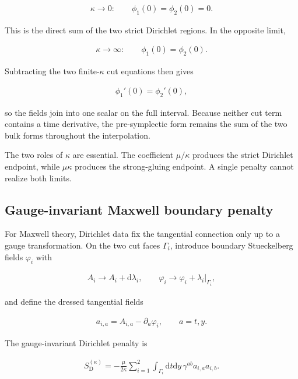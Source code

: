 \begin{align}
\kappa\to0:
\qquad
\phi_1(0)=\phi_2(0)=0.
\end{align}

This is the direct sum of the two strict Dirichlet regions. In the opposite limit,

\begin{align}
\kappa\to\infty:
\qquad
\phi_1(0)=\phi_2(0).
\end{align}

Subtracting the two finite-$\kappa$ cut equations then gives

\begin{align}
\phi_1'(0)=\phi_2'(0),
\end{align}

so the fields join into one scalar on the full interval. Because neither cut term contains a time derivative, the pre-symplectic form remains the sum of the two bulk forms throughout the interpolation.

The two roles of $\kappa$ are essential. The coefficient $\mu/\kappa$ produces the strict Dirichlet endpoint, while $\mu\kappa$ produces the strong-gluing endpoint. A single penalty cannot realize both limits.

\subsection{Gauge-invariant Maxwell boundary penalty}\label{subsec:dirichlet-maxwell}

For Maxwell theory, Dirichlet data fix the tangential connection only up to a gauge transformation. On the two cut faces $\Gamma_i$, introduce boundary Stueckelberg fields $\varphi_i$ with

\begin{align}
A_i\longrightarrow A_i+\mathrm d\lambda_i,
\qquad
\varphi_i\longrightarrow\varphi_i+\lambda_i\big|_{\Gamma_i},
\end{align}

and define the dressed tangential fields

\begin{align}
a_{i,a}=A_{i,a}-\partial_a\varphi_i,
\qquad
a=t,y.
\end{align}

The gauge-invariant Dirichlet penalty is

\begin{align}
S_{\mathrm D}^{(\kappa)}
=-\frac\mu{2\kappa}
\sum_{i=1}^2\int_{\Gamma_i}\mathrm dt\mathrm dy\,
\gamma^{ab}a_{i,a}a_{i,b}.
\end{align}

